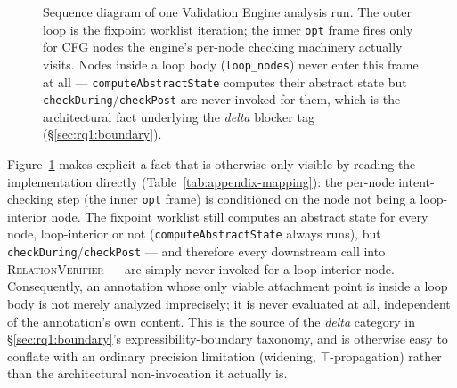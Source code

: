 \documentclass[pdflatex,sn-basic]{sn-jnl}%
\theoremstyle{thmstyleone}%
\theoremstyle{thmstyletwo}%
\theoremstyle{thmstylethree}%
\begin{document}
\begin{figure}[H]
\caption{Sequence diagram of one Validation Engine analysis run. The outer loop is the fixpoint worklist iteration; the inner \texttt{opt} frame fires only for CFG nodes the engine's per-node checking machinery actually visits. Nodes inside a loop body (\texttt{loop\_nodes}) never enter this frame at all --- \texttt{computeAbstractState} computes their abstract state but \texttt{checkDuring}/\texttt{checkPost} are never invoked for them, which is the architectural fact underlying the \emph{delta} blocker tag (\S\ref{sec:rq1:boundary}).}
\label{fig:appendix-sequence}
\end{figure}

Figure~\ref{fig:appendix-sequence} makes explicit a fact that is otherwise only visible by reading the implementation directly (Table~\ref{tab:appendix-mapping}): the per-node intent-checking step (the inner \texttt{opt} frame) is conditioned on the node not being a loop-interior node. The fixpoint worklist still computes an abstract state for every node, loop-interior or not (\texttt{computeAbstractState} always runs), but \texttt{checkDuring}/\texttt{checkPost} --- and therefore every downstream call into \textsc{RelationVerifier} --- are simply never invoked for a loop-interior node. Consequently, an annotation whose only viable attachment point is inside a loop body is not merely analyzed imprecisely; it is never evaluated at all, independent of the annotation's own content. This is the source of the \emph{delta} category in \S\ref{sec:rq1:boundary}'s expressibility-boundary taxonomy, and is otherwise easy to conflate with an ordinary precision limitation (widening, $\top$-propagation) rather than the architectural non-invocation it actually is.
\end{document}
